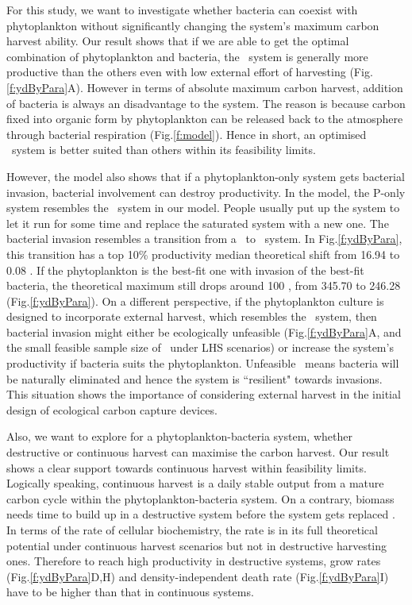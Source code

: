 \documentclass[../thesis.tex]{subfiles} %
\begin{document}
For this study, we want to investigate whether bacteria can coexist with phytoplankton without significantly changing the system’s maximum carbon harvest ability.  Our result shows that if we are able to get the optimal combination of phytoplankton and bacteria, the \PBH\ system is generally more productive than the others even with low external effort of harvesting (Fig.\ref{f:ydByPara}A).  However in terms of absolute maximum carbon harvest, addition of bacteria is always an disadvantage to the system.  The reason is because carbon fixed into organic form by phytoplankton can be released back to the atmosphere through bacterial respiration (Fig.\ref{f:model}).  Hence in short, an optimised \PBH\ system is better suited than others within its feasibility limits.

However, the model also shows that if a phytoplankton-only system gets bacterial invasion, bacterial involvement can destroy productivity.  In the model, the P-only system resembles the \PoN\ system in our model.  People usually put up the system to let it run for some time and replace the saturated system with a new one.  The bacterial invasion resembles a transition from a \PoN\ to \PBN\ system.  In Fig.\ref{f:ydByPara}, this transition has a top 10\% productivity median theoretical shift from 16.94 to 0.08 \dxdt.  If the phytoplankton is the best-fit one with invasion of the best-fit bacteria, the theoretical maximum still drops around 100 \dxdt, from 345.70 to 246.28 (Fig.\ref{f:ydByPara}).  On a different perspective, if the phytoplankton culture is designed to incorporate external harvest, which resembles the \PoH\ system, then bacterial invasion might either be ecologically unfeasible (Fig.\ref{f:ydByPara}A, and the small feasible sample size of \PBH\ under LHS scenarios) or increase the system’s productivity if bacteria suits the phytoplankton.  Unfeasible \PBH\ means bacteria will be naturally eliminated and hence the system is ``resilient" towards invasions.  This situation shows the importance of considering external harvest in the initial design of ecological carbon capture devices.

Also, we want to explore for a phytoplankton-bacteria system, whether destructive or continuous harvest can maximise the carbon harvest.  Our result shows a clear support towards continuous harvest within feasibility limits.  Logically speaking, continuous harvest is a daily stable output from a mature carbon cycle within the phytoplankton-bacteria system.  On a contrary, biomass needs time to build up in a destructive system before the system gets replaced \autocite{aytekin2016statistical}.  In terms of the rate of cellular biochemistry, the rate is in its full theoretical potential under continuous harvest scenarios but not in destructive harvesting ones.  Therefore to reach high productivity in destructive systems, grow rates (Fig.\ref{f:ydByPara}D,H) and density-independent death rate (Fig.\ref{f:ydByPara}I) have to be higher than that in continuous systems.
\end{document}
